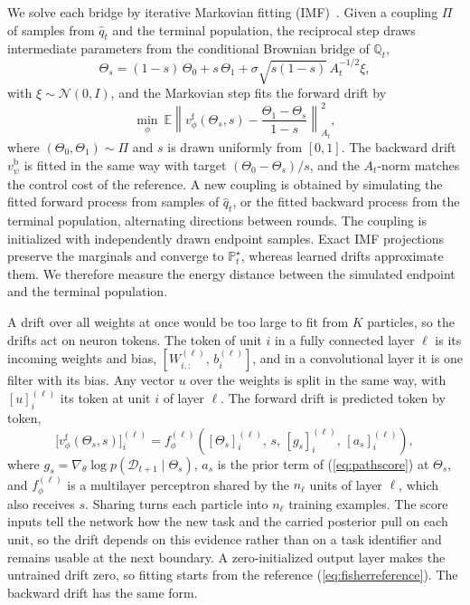 We solve each bridge by iterative Markovian fitting
(IMF)~\cite{shi2023dsbm,peluchetti2023idbm}. Given a coupling $\Pi$ of samples
from $\hat q_t$ and the terminal population, the reciprocal step draws
intermediate parameters from the conditional Brownian bridge of $\mathbb{Q}_t$,
\begin{equation}
    \Theta_s=(1-s)\,\Theta_0+s\,\Theta_1+\sigma\sqrt{s(1-s)}\,A_t^{-1/2}\xi,
    \label{eq:conditionalbridge}
\end{equation}
with $\xi\sim\mathcal{N}(0,I)$, and the Markovian step fits the forward drift by
\begin{equation}
    \min_\phi\ \mathbb{E}\left\|v^{\mathrm{f}}_\phi(\Theta_s,s)
    -\frac{\Theta_1-\Theta_s}{1-s}\right\|_{A_t}^{2},
    \label{eq:lossf}
\end{equation}
where $(\Theta_0,\Theta_1)\sim\Pi$ and $s$ is drawn uniformly from $[0,1]$. The
backward drift $v^{\mathrm{b}}_\psi$ is fitted in the same way with target
$(\Theta_0-\Theta_s)/s$, and the $A_t$-norm matches the control cost of the
reference. A new coupling is obtained by simulating the fitted forward process
from samples of $\hat q_t$, or the fitted backward process from the terminal
population, alternating directions between rounds. The coupling is initialized
with independently drawn endpoint samples. Exact IMF projections preserve the
marginals and converge to $\mathbb{P}^\star_t$, whereas learned drifts
approximate them. We therefore measure the energy distance between the
simulated endpoint and the terminal population.

A drift over all weights at once would be too large to fit from $K$ particles,
so the drifts act on neuron tokens. The token of unit $i$ in a fully connected
layer $\ell$ is its incoming weights and bias,
$[W^{(\ell)}_{i,:},\,b^{(\ell)}_i]$, and in a convolutional layer it is one
filter with its bias. Any vector $u$ over the weights is split in the same way,
with $[u]^{(\ell)}_i$ its token at unit $i$ of layer $\ell$. The forward drift is
predicted token by token,
\begin{equation}
    \big[v^{\mathrm{f}}_\phi(\Theta_s,s)\big]^{(\ell)}_i
    =f^{(\ell)}_\phi\!\left([\Theta_s]^{(\ell)}_i,\,s,\,[g_s]^{(\ell)}_i,\,
    [a_s]^{(\ell)}_i\right),
    \label{eq:tokendrift}
\end{equation}
where $g_s=\nabla_\theta\log p(\mathcal{D}_{t+1}\mid\Theta_s)$, $a_s$ is the
prior term of (\ref{eq:pathscore}) at $\Theta_s$, and $f^{(\ell)}_\phi$ is a
multilayer perceptron shared by the $n_\ell$ units of layer $\ell$, which also
receives $s$. Sharing turns each particle into $n_\ell$ training examples. The
score inputs tell the network how the new task and the carried posterior pull on
each unit, so the drift depends on this evidence rather than on a task
identifier and remains usable at the next boundary. A zero-initialized output
layer makes the untrained drift zero, so fitting starts from the reference
(\ref{eq:fisherreference}). The backward drift has the same form.

